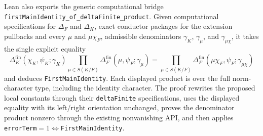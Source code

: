 \begin{definition}
Lean also exports the generic computational bridge
\texttt{firstMainIdentity\_of\_deltaFinite\_product}.  Given computational
specifications for $\Delta_F$ and $\Delta_K$, exact conductor packages for
the extension pullbacks and every $\mu$ and $\mu\chi_F$, admissible
denominators $\gamma_K$, $\gamma_{\mu}$, and $\gamma_{\mu\chi}$, it takes the
single explicit equality
\[
 \Delta^{\mathrm{fin}}_K(\chi_K,\psi_K;\gamma_K)
 \prod_{\mu\in S(K/F)}
   \Delta^{\mathrm{fin}}_F(\mu,\psi_F;\gamma_{\mu})
 =
 \prod_{\mu\in S(K/F)}
   \Delta^{\mathrm{fin}}_F(\mu\chi_F,\psi_F;\gamma_{\mu\chi})
\]
and deduces \texttt{FirstMainIdentity}.  Each displayed product is over the
full norm-character type, including the identity character.  The proof
rewrites the proposed local constants through their \texttt{deltaFinite}
specifications, uses the displayed equality with its left/right orientation
unchanged, proves the denominator product nonzero through the existing
nonvanishing API, and then applies
\texttt{errorTerm}$=1\Longleftrightarrow$\texttt{FirstMainIdentity}.


\end{definition}
